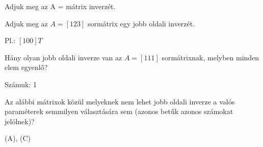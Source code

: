 \begin{frame}
  \begin{tcolorbox}[title={6/5. -N-}]
     Adjuk meg az A = mátrix inverzét.
  \tcblower

    \mmedskip 
    
    
  \end{tcolorbox}
\end{frame}


\begin{frame}
  \begin{tcolorbox}[title={6/6. -N-}]
     Adjuk meg az $A = [1 2 3]$ sormátrix egy jobb oldali inverzét.
  \tcblower

    \mmedskip 
    
     Pl.: $[1 0 0]T$
  \end{tcolorbox}
\end{frame}


\begin{frame}
  \begin{tcolorbox}[title={6/7. -N-}]
     Hány olyan jobb oldali inverze van az $A = [1 1 1]$ sormátrixnak, melyben minden elem egyenlő?
  \tcblower

    \mmedskip 
    
     Számuk: 1
  \end{tcolorbox}
\end{frame}


\begin{frame}
  \begin{tcolorbox}[title={6/8. -Q-}]
     Az alábbi mátrixok közül melyeknek nem lehet jobb oldali inverze a valós paraméterek semmilyen választására sem (azonos betűk azonos számokat jelölnek)? 
     

  \tcblower

    \mmedskip 
    
     (A), (C)
  \end{tcolorbox}
\end{frame}


